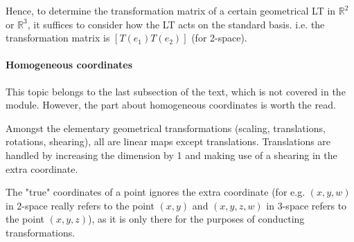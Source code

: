 \documentclass{article}
\begin{document}
Hence, to determine the transformation matrix of a certain geometrical LT in $\mathbb{R}^2$ or $\mathbb{R}^3$, it suffices to consider how the LT acts on the standard basis. i.e. the transformation matrix is $[T(e_1) T(e_2)]$ (for 2-space).

\paragraph{Homogeneous coordinates} This topic belongs to the last subsection of the text, which is not covered in the module. However, the part about homogeneous coordinates is worth the read.

Amongst the elementary geometrical transformations (scaling, translations, rotations, shearing), all are linear maps except translations. Translations are handled by increasing the dimension by 1 and making use of a shearing in the extra coordinate.

The "true" coordinates of a point ignores the extra coordinate (for e.g. $(x,y,w)$ in 2-space really refers to the point $(x,y)$ and $(x,y,z,w)$ in 3-space refers to the point $(x,y,z)$), as it is only there for the purposes of conducting transformations.
\end{document}
